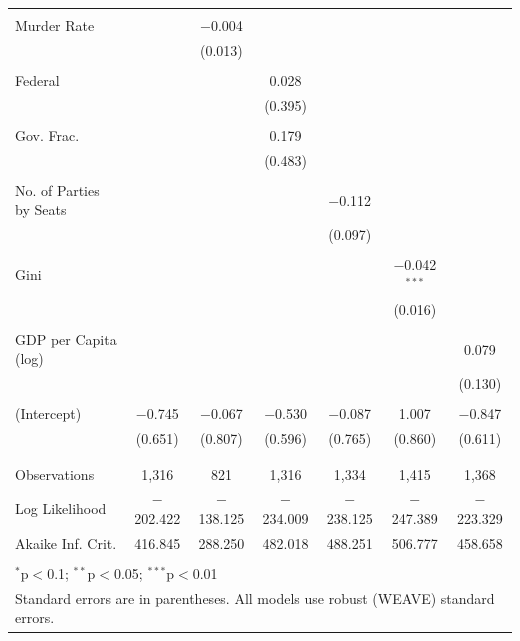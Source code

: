 \documentclass[a4paper]{article}\usepackage[]{graphicx}\usepackage[]{color}
\begin{document}
\begin{table}
\begin{center}
{\begin{tabular}{@{\extracolsep{5pt}}lcccccc}
  & & & & & & \\ 
 Murder Rate &  & $-$0.004 &  &  &  &  \\ 
  &  & (0.013) &  &  &  &  \\ 
  & & & & & & \\ 
 Federal &  &  & 0.028 &  &  &  \\ 
  &  &  & (0.395) &  &  &  \\ 
  & & & & & & \\ 
 Gov. Frac. &  &  & 0.179 &  &  &  \\ 
  &  &  & (0.483) &  &  &  \\ 
  & & & & & & \\ 
 No. of Parties by Seats &  &  &  & $-$0.112 &  &  \\ 
  &  &  &  & (0.097) &  &  \\ 
  & & & & & & \\ 
 Gini &  &  &  &  & $-$0.042$^{***}$ &  \\ 
  &  &  &  &  & (0.016) &  \\ 
  & & & & & & \\ 
 GDP per Capita (log) &  &  &  &  &  & 0.079 \\ 
  &  &  &  &  &  & (0.130) \\ 
  & & & & & & \\ 
 (Intercept) & $-$0.745 & $-$0.067 & $-$0.530 & $-$0.087 & 1.007 & $-$0.847 \\ 
  & (0.651) & (0.807) & (0.596) & (0.765) & (0.860) & (0.611) \\ 
  & & & & & & \\ 
\hline \\[-1.8ex] 
Observations & 1,316 & 821 & 1,316 & 1,334 & 1,415 & 1,368 \\ 
Log Likelihood & $-$202.422 & $-$138.125 & $-$234.009 & $-$238.125 & $-$247.389 & $-$223.329 \\ 
Akaike Inf. Crit. & 416.845 & 288.250 & 482.018 & 488.251 & 506.777 & 458.658 \\ 
\hline 
\hline \\[-1.8ex] 
\multicolumn{7}{l}{$^{*}$p$<$0.1; $^{**}$p$<$0.05; $^{***}$p$<$0.01} \\ 
\multicolumn{7}{l}{Standard errors are in parentheses. All models use robust (WEAVE) standard errors.} \\ 
\end{tabular} 

}
\end{center}
\end{table}
\end{document}
